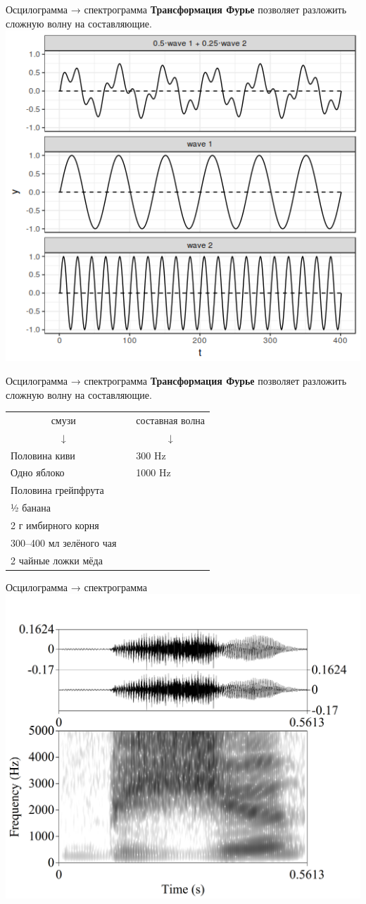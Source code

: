 \begin{frame}{Осцилограмма → спектрограмма}
\textbf{Трансформация Фурье} позволяет разложить сложную волну на составляющие. \vfill
\includegraphics[width=0.65\linewidth]{12-complex.png}
\end{frame}

\begin{frame}{Осцилограмма → спектрограмма}
\textbf{Трансформация Фурье} позволяет разложить сложную волну на составляющие. \vfill
\begin{tabular}{lll}

\multicolumn{1}{c}{смузи} &  & \multicolumn{1}{c}{составная волна} \\ 
\multicolumn{1}{c}{↓} & \multicolumn{1}{c}{} & \multicolumn{1}{c}{↓} \\ 
Половина киви  &  & 300 Hz \\ 
Одно яблоко &  & 1000 Hz \\ 
Половина грейпфрута &  & \\ 
½ банана &  & \\ 
2 г имбирного корня &  & \\ 
300–400 мл зелёного чая &  & \\ 
2 чайные ложки мёда &  & \\ 
\end{tabular}
\end{frame}

\begin{frame}{Осцилограмма → спектрограмма}
\includegraphics[width=0.85\linewidth]{13-spectrum.png}
\end{frame}


